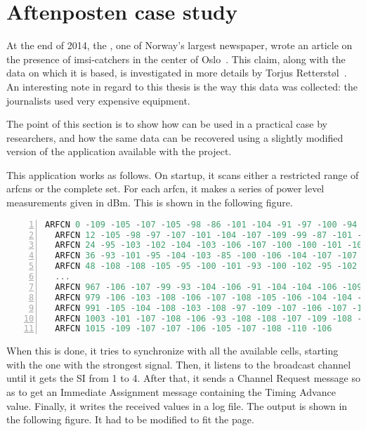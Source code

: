 \chapter{Aftenposten case study}

    At the end of 2014, the , one of Norway's largest
    newspaper, wrote an article on the presence of \gls{imsi}-catchers
    in the center of Oslo~\cite{timberg_for_2014}. This claim, along
    with the data on which it is based, is investigated in more details
    by Torjus Retterstøl~\cite{torjus}. An interesting note in
    regard to this thesis is the way this data was collected: the
    journalists used very expensive equipment.

    The point of this section is to show how  can be
    used in a practical case by researchers, and how the same data can
    be recovered using a slightly modified version of the
     application available with the 
    project.

      This application works as follows. On startup, it scans either a
      restricted range of \gls{arfcn}s or the complete set. For each
      \gls{arfcn}, it makes a series of power level measurements given
      in dBm. This is shown in the following figure.

      \begin{lstlisting}[language=C, numbers=left,
      basicstyle=\footnotesize, breaklines=true, frame=single]
  ARFCN 0 -109 -105 -107 -105 -98 -86 -101 -104 -91 -97 -100 -94
  ARFCN 12 -105 -98 -97 -107 -101 -104 -107 -109 -99 -87 -101 -103
  ARFCN 24 -95 -103 -102 -104 -103 -106 -107 -100 -100 -101 -105 -107
  ARFCN 36 -93 -101 -95 -104 -103 -85 -100 -106 -104 -107 -107 -105
  ARFCN 48 -108 -108 -105 -95 -100 -101 -93 -100 -102 -95 -102 -87
  ...
  ARFCN 967 -106 -107 -99 -93 -104 -106 -91 -104 -104 -106 -109 -106
  ARFCN 979 -106 -103 -108 -106 -107 -108 -105 -106 -104 -104 -104 -105
  ARFCN 991 -105 -104 -108 -103 -108 -97 -109 -107 -106 -107 -107 -107
  ARFCN 1003 -101 -107 -108 -106 -93 -108 -108 -107 -109 -108 -109 -107
  ARFCN 1015 -109 -107 -107 -106 -105 -107 -108 -110 -106
      \end{lstlisting}

      When this is done, it tries to synchronize with all the available
      cells, starting with the one with the strongest signal. Then, it
      listens to the broadcast channel until it gets the SI from 1 to 4.
      After that, it sends a Channel Request message so as to get an
      Immediate Assignment message containing the Timing Advance value.
      Finally, it writes the received values in a log file. The output
      is shown in the following figure. It had to be modified to fit the
      page.\\

